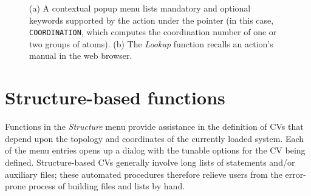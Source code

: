 \documentclass[preprint,12pt]{elsarticle}
\begin{document}
\begin{figure}
  \centering
  \caption{(a) A contextual popup menu lists mandatory and
    optional keywords supported by the action under the pointer (in
    this case, \texttt{COORDINATION}, which computes the coordination
    number of one or two groups of atoms). (b) The \emph{Lookup} function
    recalls an action's manual in the web browser. }
  \label{fig:help}
\end{figure}





\section{Structure-based functions}


Functions in the \emph{Structure} menu provide assistance in the
definition of CVs that depend upon the topology and coordinates of
the currently loaded system.  Each of the menu entries opens up a
dialog with the tunable options for the CV being defined. Structure-based CVs
generally involve long lists of statements and/or auxiliary files;
these automated procedures therefore relieve users from the error-prone
process of building files and lists by hand.
\end{document}
